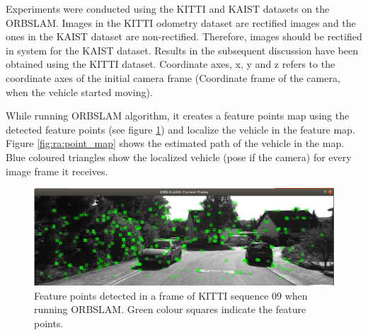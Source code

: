 Experiments were conducted using the \gls{KITTI} and \gls{KAIST} datasets on the \gls{ORBSLAM}. Images in the \gls{KITTI} odometry dataset are rectified images and the ones in the \gls{KAIST} dataset are non-rectified. Therefore, images should be rectified in system for the \gls{KAIST} dataset. Results in the subsequent discussion have been obtained using the \gls{KITTI} dataset. Coordinate axes, x, y and z refers to the coordinate axes of the initial camera frame (Coordinate frame of the camera, when the vehicle started moving).

While running \gls{ORBSLAM} algorithm, it creates a feature points map using the detected feature points (see figure \ref{fig:ra:detected_features}) and localize the vehicle in the feature map. Figure \ref{fig:ra:point_map} shows the estimated path of the vehicle in the map. Blue coloured triangles show the localized vehicle (pose if the camera) for every image frame it receives.
\begin{figure}[h]
	\centering
	\includegraphics[width=\textwidth]{figs/detected_features.png}
	\vspace{-0.5cm}
	\caption[Detected feature points]{Feature points detected in a frame of \gls{KITTI} sequence 09 when running \gls{ORBSLAM}. Green colour squares indicate the feature points.}
	\label{fig:ra:detected_features}
	\vspace{0.5cm}
\end{figure}
